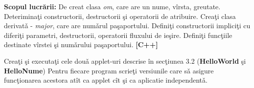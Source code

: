 \textbf{Scopul lucr\u{a}rii:} De creat clasa \emph{om}, care are un nume, v\^{i}rsta, greutate. Deterimina\c{t}i constructorii, destructorii \c{s}i operatorii de atribuire. Crea\c{t}i clasa derivat\v{a} - \emph{major},
care are num\v{a}rul pa\c{s}aportului. Defini\c{t}i constructorii implici\c{t}i cu diferi\c{t}i parametri, destructorii, operatorii fluxului de ie\c{s}ire. Defini\c{t}i func\c{t}iile destinate v\^{i}rstei
\c{s}i num\v{a}rului pa\c{s}aportului. \textbf{[C++]}

Crea\c{t}i \c{s}i executa\c{t}i cele dou\v{a} applet-uri descrise \^{i}n sec\c{t}iunea 3.2 (\textbf{HelloWorld} \c{s}i \textbf{HelloNume})
Pentru fiecare program scrie\c{t}i versiunile care s\v{a} asigure func\c{t}ionarea acestora at\^{i}t ca applet c\^{i}t \c{s}i ca aplicatie independent\v{a}.

